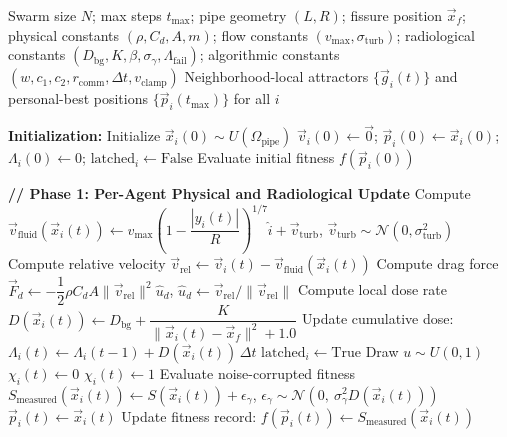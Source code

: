 \documentclass[journal]{IEEEtran}
\begin{document}
\begin{algorithm}[t]
\caption{Communication-Degradation-Tolerant Decentralized M-PSO for Turbulent Pipe Inspection}
\label{alg:mpso}
\begin{algorithmic}[1]
\Require Swarm size $N$; max steps $t_{\max}$; pipe geometry $(L, R)$; fissure position $\vec{x}_f$; physical constants $(\rho, C_d, A, m)$; flow constants $(v_{\max}, \sigma_{\text{turb}})$; radiological constants $(D_{\text{bg}}, K, \beta, \sigma_\gamma, \Lambda_{\text{fail}})$; algorithmic constants $(w, c_1, c_2, r_{\text{comm}}, \Delta t, v_{\text{clamp}})$
\Ensure Neighborhood-local attractors $\{\vec{g}_i(t)\}$ and personal-best positions $\{\vec{p}_i(t_{\max})\}$ for all $i$

\State \textbf{Initialization:}
    \State Initialize $\vec{x}_i(0) \sim U(\Omega_{\text{pipe}})$ 
    \State $\vec{v}_i(0) \leftarrow \vec{0}$; \quad $\vec{p}_i(0) \leftarrow \vec{x}_i(0)$; \quad $\Lambda_i(0) \leftarrow 0$; \quad $\text{latched}_i \leftarrow \text{False}$
    \State Evaluate initial fitness $f(\vec{p}_i(0))$
\EndFor

    \State \textbf{// Phase 1: Per-Agent Physical and Radiological Update}
        \State Compute $\vec{v}_{\text{fluid}}(\vec{x}_i(t)) \leftarrow v_{\max}\left(1 - \dfrac{|y_i(t)|}{R}\right)^{1/7}\hat{i} + \vec{v}_{\text{turb}}$, \quad $\vec{v}_{\text{turb}} \sim \mathcal{N}(0, \sigma_{\text{turb}}^2)$
        \State Compute relative velocity $\vec{v}_{\text{rel}} \leftarrow \vec{v}_i(t) - \vec{v}_{\text{fluid}}(\vec{x}_i(t))$
        \State Compute drag force $\vec{F}_d \leftarrow -\dfrac{1}{2}\rho C_d A \|\vec{v}_{\text{rel}}\|^2 \hat{u}_d$, \quad $\hat{u}_d \leftarrow \vec{v}_{\text{rel}} / \|\vec{v}_{\text{rel}}\|$
        \State Compute local dose rate $D(\vec{x}_i(t)) \leftarrow D_{\text{bg}} + \dfrac{K}{\|\vec{x}_i(t) - \vec{x}_f\|^2 + 1.0}$
        \State Update cumulative dose: $\Lambda_i(t) \leftarrow \Lambda_i(t-1) + D(\vec{x}_i(t))\,\Delta t$
            \State $\text{latched}_i \leftarrow \text{True}$ 
        \EndIf
        \State Draw $u \sim U(0,1)$
            \State $\chi_i(t) \leftarrow 0$ 
        \Else
            \State $\chi_i(t) \leftarrow 1$
        \EndIf
        \State Evaluate noise-corrupted fitness $S_{\text{measured}}(\vec{x}_i(t)) \leftarrow S(\vec{x}_i(t)) + \epsilon_\gamma$, \quad $\epsilon_\gamma \sim \mathcal{N}(0,\ \sigma_\gamma^2 D(\vec{x}_i(t)))$
            \State $\vec{p}_i(t) \leftarrow \vec{x}_i(t)$
            \State Update fitness record: $f(\vec{p}_i(t)) \leftarrow S_{\text{measured}}(\vec{x}_i(t))$
        \EndIf
    \EndFor


\end{algorithmic}
\end{algorithm}
\end{document}
